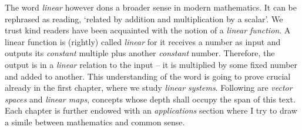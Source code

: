 The word \emph{linear} however dons a broader sense in modern mathematics. It
can be rephrased as reading, `related by addition and multiplication by a
scalar'. We trust kind readers have been acquainted with the notion of a
\emph{linear function}. A linear function is (rightly) called \emph{linear} for
it receives a number as input and outputs its \emph{constant} multiple plus
another \emph{constant} number. Therefore, the output is in a \emph{linear}
relation to the input -- it is multiplied by some fixed number and added to
another. This understanding of the word is going to prove crucial already in the
first chapter, where we study \emph{linear systems}. Following are \emph{vector
spaces} and \emph{linear maps}, concepts whose depth shall occupy the span of
this text. Each chapter is further endowed with an \emph{applications} section
where I try to draw a simile between mathematics and common sense.
